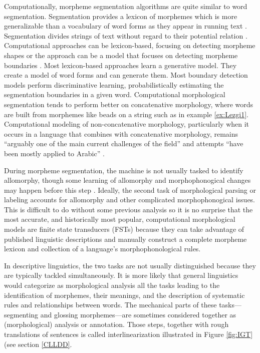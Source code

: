 \documentclass[12pt]{article}
\begin{document}
Computationally, morpheme segmentation algorithms are quite similar to word segmentation. Segmentation provides a lexicon of morphemes which is more generalizable than a vocabulary of word forms as they appear in running text \cite{creutz_unsupervised_2002}. Segmentation divides strings of text without regard to their potential relation \cite{virpioja_empirical_2011}. Computational approaches can be lexicon-based, focusing on detecting morpheme shapes or the approach can be a model that focuses on detecting morpheme boundaries \cite{goodman_generation_2013}. Most lexicon-based approaches learn a generative model. They create a model of word forms and can generate them. Most boundary detection models perform discriminative learning, probabilistically estimating the segmentation boundaries in a given word. Computational morphological segmentation tends to perform better on concatenative morphology, where words are built from morphemes like beads on a string such as in example \ref{ex:Lezgi1}. Computational modeling of non-concatenative morphology, particularly when it occurs in a language that combines with concatenative morphology, remains ``arguably one of the main current challenges of the field'' and attempts ``have been mostly applied to Arabic'' \cite{goldsmith_computational_2017}. 

During morpheme segmentation, the machine is not usually tasked to identify allomorphy, though some learning of allomorphy and morphophonogical changes may happen before this step \cite{goldsmith_computational_2017}. Ideally, the second task of morphological parsing or labeling accounts for allomorphy and other complicated morphophonogical issues. This is difficult to do without some previous analysis so it is no surprise that the most accurate, and historically most popular, computational morphological models are finite state transducers (FSTs) because they can take advantage of published linguistic descriptions and manually construct a complete morpheme lexicon and collection of a language's morphophonological rules. 

In descriptive linguistics, the two tasks are not usually distinguished because they are typically tackled simultaneously. It is more likely that general linguistics would categorize as morphological analysis all the tasks leading to the identification of morphemes, their meanings, and the description of systematic rules and relationships between words. The mechanical parts of these tasks---segmenting and glossing morphemes---are sometimes considered together as (morphological) analysis or annotation. Those steps, together with rough translations of sentences is called interlinearization illustrated in Figure \ref{fig:IGT} (see section \ref{CLLDD}.
\end{document}
